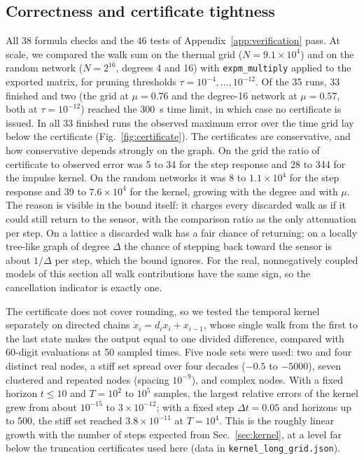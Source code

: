 \subsection{Correctness and certificate tightness}\label{sec:accuracy}
All 38 formula checks and the 46 tests of Appendix~\ref{app:verification} pass. At scale, we compared the walk sum on the thermal grid ($N=9.1\times10^4$) and on the random network ($N=2^{16}$, degrees 4 and 16) with \texttt{expm\_multiply} applied to the exported matrix, for pruning thresholds $\tau=10^{-4},\dots,10^{-12}$. Of the 35 runs, 33 finished and two (the grid at $\mu=0.76$ and the degree-16 network at $\mu=0.57$, both at $\tau=10^{-12}$) reached the 300~s time limit, in which case no certificate is issued. In all 33 finished runs the observed maximum error over the time grid lay below the certificate (Fig.~\ref{fig:certificate}). The certificates are conservative, and how conservative depends strongly on the graph. On the grid the ratio of certificate to observed error was 5 to 34 for the step response and 28 to 344 for the impulse kernel. On the random networks it was 8 to $1.1\times10^4$ for the step response and 39 to $7.6\times10^4$ for the kernel, growing with the degree and with $\mu$. The reason is visible in the bound itself: it charges every discarded walk as if it could still return to the sensor, with the comparison ratio as the only attenuation per step. On a lattice a discarded walk has a fair chance of returning; on a locally tree-like graph of degree $\Delta$ the chance of stepping back toward the sensor is about $1/\Delta$ per step, which the bound ignores. For the real, nonnegatively coupled models of this section all walk contributions have the same sign, so the cancellation indicator is exactly one.

The certificate does not cover rounding, so we tested the temporal kernel separately on directed chains $\dot x_i=d_ix_i+x_{i-1}$, whose single walk from the first to the last state makes the output equal to one divided difference, compared with 60-digit evaluations at 50 sampled times. Five node sets were used: two and four distinct real nodes, a stiff set spread over four decades ($-0.5$ to $-5000$), seven clustered and repeated nodes (spacing $10^{-9}$), and complex nodes. With a fixed horizon $t\le10$ and $T=10^2$ to $10^5$ samples, the largest relative errors of the kernel grew from about $10^{-15}$ to $3\times10^{-12}$; with a fixed step $\Delta t=0.05$ and horizons up to 500, the stiff set reached $3.8\times10^{-11}$ at $T=10^4$. This is the roughly linear growth with the number of steps expected from Sec.~\ref{sec:kernel}, at a level far below the truncation certificates used here (data in \texttt{kernel\_long\_grid.json}).

